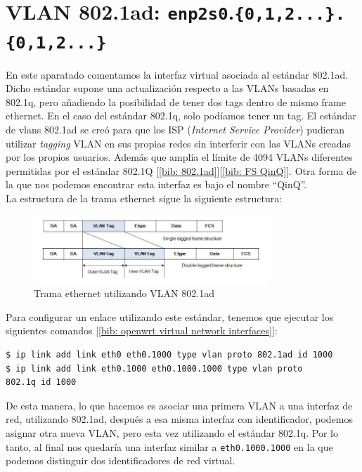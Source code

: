 \documentclass[a4paper, oneside, 12pt]{book}
\begin{document}
	\pagebreak
	
	\section{VLAN 802.1ad: \texttt{enp2s0}.\texttt{\{0,1,2...\}.\{0,1,2...\}}}
	\noindent En este aparatado comentamos la interfaz virtual asociada al estándar 802.1ad. Dicho estándar supone una actualización respecto a las VLANs basadas en 802.1q, pero añadiendo la posibilidad de tener dos tags dentro de mismo frame ethernet. En el caso del estándar 802.1q, solo podíamos tener un tag. El estándar de vlans 802.1ad se creó para que los ISP (\textit{Internet Service Provider}) pudieran utilizar \textit{tagging} VLAN en sus propias redes sin interferir con las VLANs creadas por los propios usuarios. Además que amplía el límite de 4094 VLANs diferentes permitidas por el estándar 802.1Q [\ref{bib: 802.1ad}][\ref{bib: FS QinQ}]. Otra forma de la que nos podemos encontrar esta interfaz es bajo el nombre ``QinQ''. \\
	
	\noindent La estructura de la trama ethernet sigue la siguiente estructura:
	
	\begin{figure}[h]
		\begin{center}
			\includegraphics[width=0.8\textwidth]{img/ethernet_8021ad.png}
			\caption{Trama ethernet utilizando VLAN 802.1ad}
			\label{ethernet 802.1ad}
		\end{center}
	\end{figure}
	
	\noindent Para configurar un enlace utilizando este estándar, tenemos que ejecutar los siguientes comandos [\ref{bib: openwrt virtual network interfaces}]:
	\begin{verbatim}
$ ip link add link eth0 eth0.1000 type vlan proto 802.1ad id 1000
$ ip link add link eth0.1000 eth0.1000.1000 type vlan proto 
802.1q id 1000
 	\end{verbatim}
 
 	\noindent De esta manera, lo que hacemos es asociar una primera VLAN a una interfaz de red, utilizando 802.1ad, después a esa misma interfaz con identificador, podemos asignar otra nueva VLAN, pero esta vez utilizando el estándar 802.1q. Por lo tanto, al final nos quedaría una interfaz similar a \texttt{eth0.1000.1000} en la que podemos distinguir dos identificadores de red virtual.
	
\end{document}
